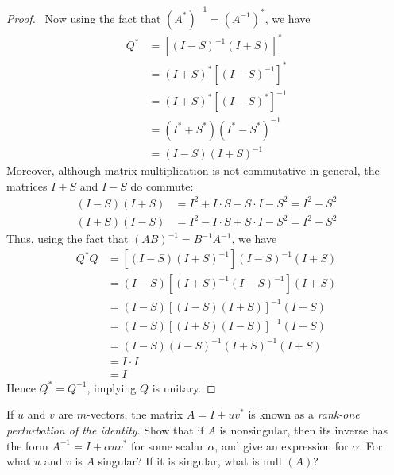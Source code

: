 \documentclass[12pt]{article}
\newenvironment{ex}[2][Exercise]{\begin{trivlist}
		\item[\hskip \labelsep {\bfseries #1}\hskip \labelsep {\bfseries #2.}]}{\end{trivlist}}
\newenvironment{sol}[1][Solution]{\begin{trivlist}
		\item[\hskip \labelsep {\bfseries #1:}]}{\end{trivlist}}
\begin{document}
\begin{sol}
\begin{enumerate}[label=(\alph*)]
\begin{proof}
			\
			Now using the fact that $(A^*)^{-1}=(A^{-1})^*$, we have
			\begin{align*}
				Q^{*}&=[(I-S)^{-1}(I+S)]^*\\
				&=(I+S)^*[(I-S)^{-1}]^*\\
				&=(I+S)^*[(I-S)^*]^{-1}\\
				&=(I^*+S^*)(I^*-S^*)^{-1}\\
				&=(I-S)(I+S)^{-1}
			\end{align*}
			Moreover, although matrix multiplication is not commutative in general,
			the matrices $I+S$ and $I-S$ do commute:
			\begin{align*}
				(I-S)(I+S)&=I^2 +I\cdot S - S\cdot I - S^2 = I^2 - S^2\\
				(I+S)(I-S)&=I^2 -I\cdot S + S\cdot I - S^2 = I^2 - S^2
			\end{align*}
			Thus, using the fact that $(AB)^{-1}=B^{-1}A^{-1}$, we have
			\begin{align*}
				Q^*Q &= [(I-S)(I+S)^{-1}](I-S)^{-1}(I+S)\\
				&=(I-S)[(I+S)^{-1}(I-S)^{-1}](I+S)\\
				&=(I-S)[(I-S)(I+S)]^{-1}(I+S)\\
				&=(I-S)[(I+S)(I-S)]^{-1}(I+S)\\
				&=(I-S)(I-S)^{-1}(I+S)^{-1}(I+S)\\
				&=I\cdot I\\
				&=I
			\end{align*}
			Hence $Q^*=Q^{-1}$, implying $Q$ is unitary.
		\end{proof}
	\end{enumerate}
\end{sol}

\begin{ex}{6}
	If $u$ and $v$ are $m$-vectors, the matrix $A=I+uv^*$ is known as a \emph{rank-one perturbation
		of the identity}. Show that if $A$ is nonsingular, then its inverse has the form
	$A^{-1}= I + \alpha uv^*$ for some scalar $\alpha$, and give an expression for $\alpha$. For
	what $u$ and $v$ is $A$ singular? If it is singular, what is $\text{null }(A)$?
\end{ex}
\end{document}
